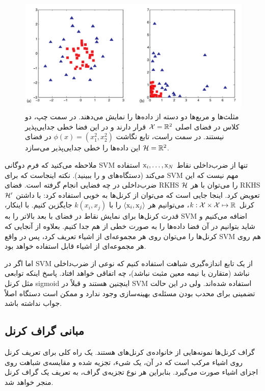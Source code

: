 \begin{figure}[ht]
\centering
\includegraphics[scale=0.35]{./non-linearly-separable-data.png}
\caption{مثلث‌ها و مربع‌ها دو دسته از داده‌ها را نمایش می‌دهند. در سمت چپ، دو کلاس در فضای اصلی $\mathcal{X} = \mathbb{R}^2$ قرار دارند و در این فضا خطی‌ جدایی‌پذیر نیستند. در سمت راست، تابع نگاشت $\phi(x) = (x_1^2,x_2^2)$ در فضای $\mathcal{H} = \mathbb{R}^2$ این داده‌ها را خطی جدایی‌پذیر می‌سازد.}
\label{fig:non-linearly-separable-data}
\end{figure}

ملاحظه می‌کنید که فرم دوگانی SVM تنها از ضرب‌داخلی نقاط $\mathrm{x}_i,\ldots,\mathrm{x}_N$ استفاده می‌کند (دستگاه‌های  و  را ببینید). نکته اینجاست که برای SVM مهم نیست که این ضرب‌داخلی در چه فضایی انجام گرفته است. فضای RKHS $\mathcal{H}$ را می‌توان با هر RKHS $\mathcal{H}^\prime$ تعویض کرد. اینجا جایی است که می‌توان از کرنل‌ها به خوبی استفاده کرد: با داشتن کرنل $k: \mathcal{X}\times \mathcal{X} \mapsto \mathbb{R}$، می‌توانیم هر $\langle \mathrm{x}_i,\mathrm{x}_j \rangle$ را با $k(x_i,x_j)$ جایگزین کنیم. با اینکار، قدرت کرنل‌ها برای نمایش نقاط در فضای با بعد بالاتر را به SVM اضافه می‌کنیم و شاید بتوانیم در آن فضا داده‌ها را به صورت خطی از هم جدا کنیم. بعلاوه از آنجایی که کرنل‌ها را می‌توان روی هر مجموعه‌ای از اشیاء تعریف کرد، پس در واقع SVM هم روی هر مجموعه‌ای از اشیاء قابل استفاده خواهد بود.

اما اگر در SVM از یک تابع اندازه‌گیری شباهت استفاده کنیم که نوعی از ضرب‌داخلی نباشد (متقارن یا نیمه معین مثبت نباشد)، چه اتفاقی خواهد افتاد. پاسخ اینکه توابعی مثل کرنل sigmoid اینچنین هستند و قبلاً در SVM استفاده شده‌اند. ولی در این حالت تضمینی برای محدب بودن مسئله‌ی بهینه‌سازی وجود ندارد و ممکن است دستگاه  اصلاً جواب نداشته باشد.

\subsection{مبانی گراف کرنل‌}\label{sec:graph-kernel-basics}
گراف کرنل‌ها نمونه‌هایی از خانواده‌ی کرنل‌های  هستند.  یک راه کلی برای تعریف کرنل روی اشیاء مرکب است که در آن، یک شیء، تجزیه شده و مقایسه‌ی شباهت روی اجزای اشیاء صورت می‌گیرد. بنابراین هر نوع تجزیه‌ی گراف، به تعریف یک گراف کرنل منجر خواهد شد.

